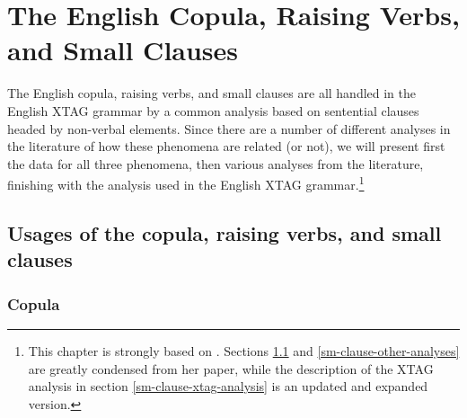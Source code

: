\chapter{The English Copula, Raising Verbs, and Small Clauses}
\label{small-clauses}

The English copula, raising verbs, and small clauses are all handled in the
English XTAG grammar by a common analysis based on sentential clauses
headed by non-verbal elements.  Since there are a number of different
analyses in the literature of how these phenomena are related (or not), we
will present first the data for all three phenomena, then various analyses
from the literature, finishing with the analysis used in the English XTAG
grammar.\footnote{%
%
This chapter is strongly based on \cite{heycock91}.
Sections \ref{sm-clause-data} and \ref{sm-clause-other-analyses} are
greatly condensed from her paper, while the description of the XTAG
analysis in section \ref{sm-clause-xtag-analysis} is an updated and
expanded version.%
%
}

\section{Usages of the copula, raising verbs, and small clauses}
\label{sm-clause-data}

\subsection{Copula}
\label{copula-data}

